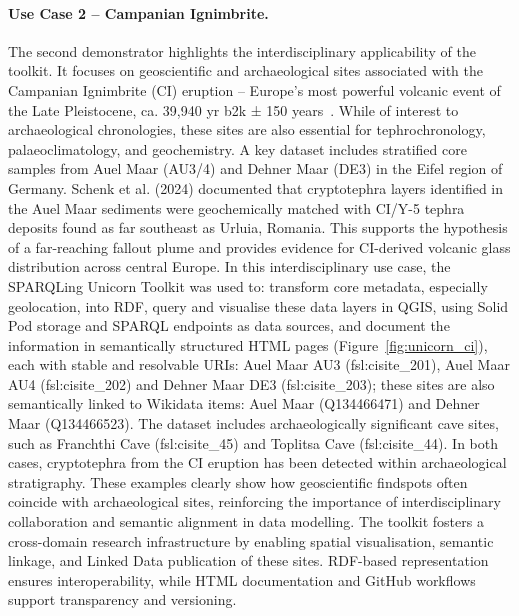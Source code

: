 \documentclass{eceasst}
\begin{document}
\paragraph{Use Case 2 – Campanian Ignimbrite.} The second demonstrator highlights the interdisciplinary applicability of the toolkit. It focuses on geoscientific and archaeological sites associated with the Campanian Ignimbrite (CI) eruption – Europe’s most powerful volcanic event of the Late Pleistocene, ca. 39,940 yr b2k ± 150 years~\cite{schenk_cryptotephra_2024}. While of interest to archaeological chronologies, these sites are also essential for tephrochronology, palaeoclimatology, and geochemistry. A key dataset includes stratified core samples from Auel Maar (AU3/4) and Dehner Maar (DE3) in the Eifel region of Germany. Schenk et al. (2024) documented that cryptotephra layers identified in the Auel Maar sediments were geochemically matched with CI/Y-5 tephra deposits found as far southeast as Urluia, Romania. This supports the hypothesis of a far-reaching fallout plume and provides evidence for CI-derived volcanic glass distribution across central Europe. In this interdisciplinary use case, the SPARQLing Unicorn Toolkit was used to: transform core metadata, especially geolocation, into RDF, query and visualise these data layers in QGIS, using Solid Pod storage and SPARQL endpoints as data sources, and document the information in semantically structured HTML pages (Figure~\ref{fig:unicorn_ci}), each with stable and resolvable URIs: Auel Maar AU3 (fsl:cisite\_201), Auel Maar AU4 (fsl:cisite\_202) and Dehner Maar DE3 (fsl:cisite\_203); these sites are also semantically linked to Wikidata items: Auel Maar (Q134466471) and Dehner Maar (Q134466523). The dataset includes archaeologically significant cave sites, such as Franchthi Cave (fsl:cisite\_45) and Toplitsa Cave (fsl:cisite\_44). In both cases, cryptotephra from the CI eruption has been detected within archaeological stratigraphy. These examples clearly show how geoscientific findspots often coincide with archaeological sites, reinforcing the importance of interdisciplinary collaboration and semantic alignment in data modelling. The toolkit fosters a cross-domain research infrastructure by enabling spatial visualisation, semantic linkage, and Linked Data publication of these sites. RDF-based representation ensures interoperability, while HTML documentation and GitHub workflows support transparency and versioning.
\end{document}
